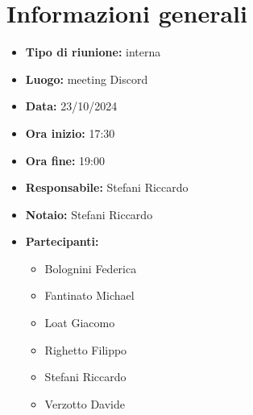 \section{Informazioni generali}

\begin{itemize}
    \item \textbf{Tipo di riunione:} interna
    \item \textbf{Luogo:} meeting Discord
    \item \textbf{Data:} 23/10/2024
    \item \textbf{Ora inizio:} 17:30
    \item \textbf{Ora fine:} 19:00
    \item \textbf{Responsabile:} Stefani Riccardo
    \item \textbf{Notaio:} Stefani Riccardo
    \item \textbf{Partecipanti:}
    \begin{itemize}
        \renewcommand{\labelitemii}{--}
        \item Bolognini Federica
        \item Fantinato Michael
        \item Loat Giacomo
        \item Righetto Filippo
        \item Stefani Riccardo
        \item Verzotto Davide
    \end{itemize}
\end{itemize}